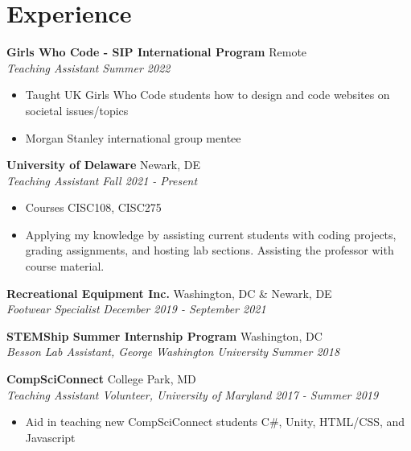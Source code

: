 \documentclass[letterpaper,10.5pt]{article}
\newcommand{\entry}[4]{%
  \vspace{2pt}
  \noindent\textbf{#1} \hfill #2 \\
  \noindent\textit{#3} \hfill \textit{#4}\par
  \vspace{-2pt}
}
\begin{document}
\section{Experience}

\entry{Girls Who Code - SIP International Program}{Remote}
      {Teaching Assistant}{Summer 2022}
      \begin{itemize}
        \item Taught UK Girls Who Code students how to design and code websites on societal issues/topics
        \item Morgan Stanley international group mentee
      \end{itemize}
\entry{University of Delaware}{Newark, DE}
      {Teaching Assistant}{Fall 2021 - Present}
      \begin{itemize}
        \item Courses CISC108, CISC275
        \item Applying my knowledge by assisting current students with coding projects, grading assignments, and hosting lab sections. Assisting the professor with course material.
      \end{itemize}
\entry{Recreational Equipment Inc.}{Washington, DC \& Newark, DE}
      {Footwear Specialist}{December 2019 - September 2021}
\entry{STEMShip Summer Internship Program}{Washington, DC}
      {Besson Lab Assistant, George Washington University}{Summer 2018}
\entry{CompSciConnect}{College Park, MD}
      {Teaching Assistant Volunteer, University of Maryland}{2017 - Summer 2019}
      \begin{itemize}
        \item Aid in teaching new CompSciConnect students C\#, Unity, HTML/CSS, and Javascript
      \end{itemize}

\end{document}

